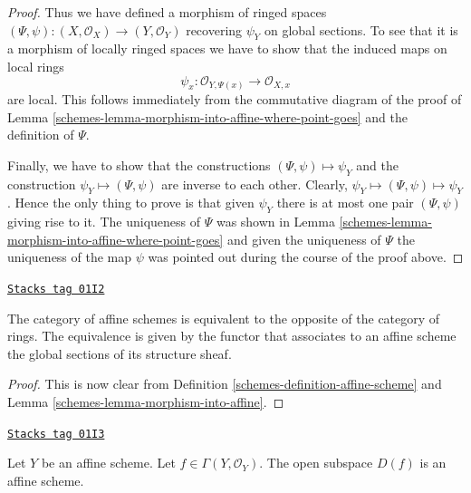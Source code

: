 \begin{proof}
\medskip\noindent
Thus we have defined a morphism of ringed spaces
$(\Psi, \psi) : (X, \mathcal{O}_X) \to (Y, \mathcal{O}_Y)$
recovering $\psi_Y$ on global sections. To see that it is
a morphism of locally ringed spaces we have to show that
the induced maps on local rings
$$
\psi_x : \mathcal{O}_{Y, \Psi(x)} \longrightarrow \mathcal{O}_{X, x}
$$
are local. This follows immediately from the commutative diagram
of the proof of Lemma \ref{schemes-lemma-morphism-into-affine-where-point-goes}
and the definition of $\Psi$.

\medskip\noindent
Finally, we have to show that the constructions
$(\Psi, \psi) \mapsto \psi_Y$ and the construction
$\psi_Y \mapsto (\Psi, \psi)$ are inverse to each other.
Clearly, $\psi_Y \mapsto (\Psi, \psi) \mapsto \psi_Y$.
Hence the only thing to prove is that given $\psi_Y$
there is at most one pair $(\Psi, \psi)$ giving rise
to it. The uniqueness of $\Psi$ was shown in Lemma
\ref{schemes-lemma-morphism-into-affine-where-point-goes} and
given the uniqueness of $\Psi$ the uniqueness of the
map $\psi$ was pointed out during the course of the proof
above.
\end{proof}

\begin{lemma}
\label{schemes-lemma-category-affine-schemes}
\href{https://stacks.math.columbia.edu/tag/01I2}{\texttt{Stacks tag 01I2}}

The category of affine schemes is equivalent to the opposite of the
category of rings. The equivalence is given by the functor that associates
to an affine scheme the global sections of its structure sheaf.
\end{lemma}

\begin{proof}

This is now clear from Definition \ref{schemes-definition-affine-scheme}
and Lemma \ref{schemes-lemma-morphism-into-affine}.
\end{proof}

\begin{lemma}
\label{schemes-lemma-standard-open-affine}
\href{https://stacks.math.columbia.edu/tag/01I3}{\texttt{Stacks tag 01I3}}

Let $Y$ be an affine scheme.
Let $f \in \Gamma(Y, \mathcal{O}_Y)$.
The open subspace $D(f)$ is an affine scheme.
\end{lemma}

